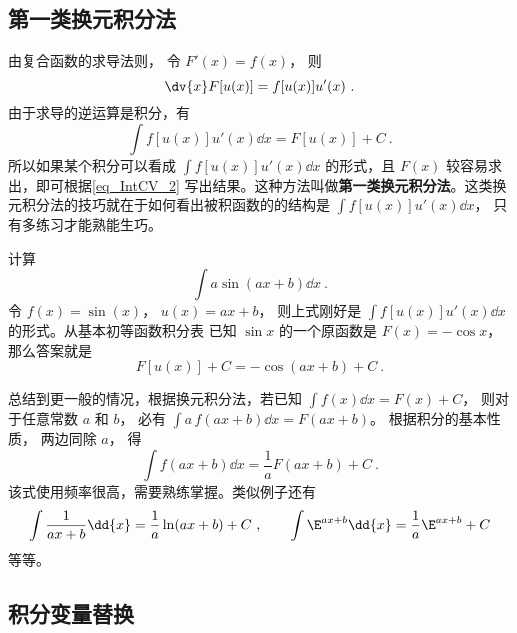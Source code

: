 
\subsection{第一类换元积分法}
由复合函数的求导法则， 令 $F'(x) = f(x)$， 则
\begin{equation}
\dv{x} F[u(x)] = f[u(x)]u'(x)~.
\end{equation}
由于求导的逆运算是积分，有
\begin{equation}\label{eq_IntCV_2}
\int f[u(x)]u'(x) \dd{x}  = F[u(x)] + C~.
\end{equation}
所以如果某个积分可以看成 $\int f[u(x)]u'(x) \dd{x}$ 的形式，且 $F(x)$ 较容易求出，即可根据\autoref{eq_IntCV_2} 写出结果。这种方法叫做\textbf{第一类换元积分法}。这类换元积分法的技巧就在于如何看出被积函数的的结构是 $\int f[u(x)]u'(x) \dd{x}$， 只有多练习才能熟能生巧。 

\begin{example}{}
计算
\begin{equation}
\int a\sin(ax + b) \dd{x}~.
\end{equation}
令 $f(x) = \sin(x)$， $u(x) = ax + b$， 则上式刚好是 $\int f[u(x)]u'(x) \dd{x}$ 的形式。从基本初等函数积分表 %
已知 $\sin x$ 的一个原函数是 $F(x) = -\cos x$， 那么答案就是
\begin{equation}
F[u(x)] + C =  - \cos(ax + b) + C~.
\end{equation}
\end{example}

总结到更一般的情况，根据换元积分法，若已知 $\int f(x) \dd{x}  = F(x) + C$， 则对于任意常数 $a$ 和 $b$， 必有 $\int a \,f(ax + b) \dd{x} = F(ax + b)$。 根据积分的基本性质，%
两边同除 $a$， 得
\begin{equation}\label{eq_IntCV_5}
\int f(ax + b) \dd{x} = \frac{1}{a} F(ax + b) + C~.
\end{equation}
该式使用频率很高，需要熟练掌握。类似例子还有
\begin{equation}
\int \frac{1}{ax+b} \dd{x} = \frac{1}{a}\ln (ax + b)+C ~, \qquad
\int \E^{ax + b} \dd{x} = \frac{1}{a} \E^{ax + b}+C
\end{equation}
等等。

\subsection{积分变量替换}

